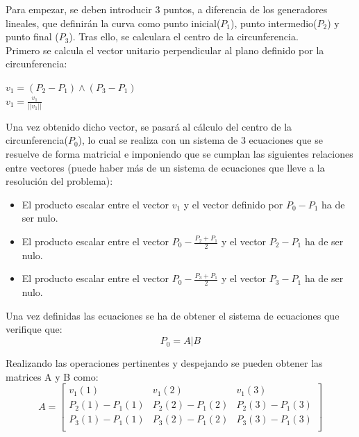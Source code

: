 	Para empezar, se deben introducir 3 puntos, a diferencia de los generadores lineales, que definirán la curva como punto inicial($P_1$), punto intermedio($P_2$) y punto final ($P_3$). Tras ello, se calculara el centro de la circunferencia.\\

	Primero se calcula el vector unitario perpendicular al plano definido por la circunferencia:
	\begin{center}
	$v_1=(P_2-P_1)\wedge(P_3-P_1)$\\
	$v_1=\frac{v_1}{||v_1||}$\\
	\end{center}

	Una vez obtenido dicho vector, se pasará al cálculo del centro de la circunferencia($P_0$), lo cual se realiza con un sistema de 3 ecuaciones que se resuelve de forma matricial e imponiendo que se cumplan las siguientes relaciones entre vectores (puede haber más de un sistema de ecuaciones que lleve a la resolución del problema):

	\begin{itemize}
		\item El producto escalar entre el vector $v_1$ y el vector definido por $P_0-P_1$ ha de ser nulo.\\
		\item El producto escalar entre el vector $P_0-\frac{P_2+P_1}{2}$ y el vector $P_2-P_1$ ha de ser nulo.\\
		\item El producto escalar entre el vector $P_0-\frac{P_3+P_1}{2}$ y el vector $P_3-P_1$ ha de ser nulo.\\
	\end{itemize}

	Una vez definidas las ecuaciones se ha de obtener el sistema de ecuaciones que verifique que:\\
	\begin{equation}
		P_0=A|B
	\end{equation}

	Realizando las operaciones pertinentes y despejando se pueden obtener las matrices A y B como:\\
	\begin{equation}
		A=
		\begin{bmatrix}
			v_1(1) & v_1(2) & v_1(3)\\
			P_2(1)-P_1(1) & P_2(2)-P_1(2) & P_2(3)-P_1(3)\\
			P_3(1)-P_1(1) & P_3(2)-P_1(2) & P_3(3)-P_1(3)\\
		\end{bmatrix}
	\end{equation}

